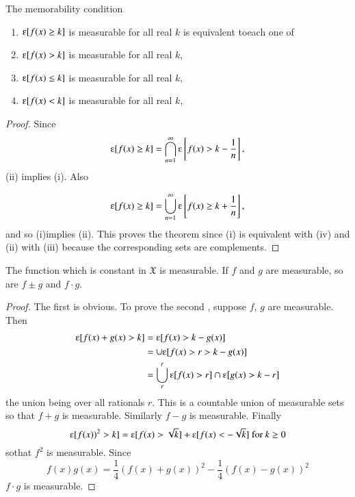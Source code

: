 \begin{theorem}\label{chap1:sec10:thm13}  %
The memorability condition
\end{theorem}

\begin{enumerate}
\renewcommand{\theenumi}{\roman{enumi}}
\renewcommand{\labelenumi}{(\theenumi)}
\item  $\varepsilonup[f(x)\geq k]$ is measurable for all real $k$ is equivalent
to\pageoriginale each one of 
 \item $\varepsilonup[f(x)> k]$ is measurable for all real $k$,
  \item $\varepsilonup[f(x)\leq k]$ is measurable for all real $k$,     
  \item $\varepsilonup[f(x)< k]$ is measurable for all real $k$,
 \end{enumerate}

 \begin{proof}
 Since
 $$
\varepsilonup[f(x)\geq k] =\bigcap^{\infty}_{n=1}
\varepsilonup\left[f(x)>k-\frac{1}{n}\right],
$$
(ii) implies (i). Also 

$$
\varepsilonup[f(x)\geq k] =\bigcup^{\infty}_{n=1} 
\varepsilonup \left[f(x)\geq k+\frac{1}{n}\right],
$$
and so (i)implies (ii). This proves the theorem since (i) is equivalent
  with (iv) and (ii) with (iii) because the corresponding sets are complements.
 \end{proof}

\begin{theorem}\label{chap1:sec10:thm14} 
  The function which is constant in $\mathfrak{X}$ is  measurable. If
  $f$ and $g$ are measurable, so are $f \pm g$ and $f \cdot g$.
\end{theorem}
  
\begin{proof}
     The first is obvious. To prove the second , suppose $f$, $g$ are
     measurable. Then 
     \begin{align*}
       \varepsilonup[f(x) +g(x)> k] &= \varepsilonup[f(x) > k-g(x)]\\
       &=\cup  \varepsilonup[f(x) >r> k-g(x)]\\
       &= \bigcup^{r}_{r} \varepsilonup[f(x) >r] \cap
       \varepsilonup[ g(x)>k-r]
     \end{align*}  
     the union being over all rationals $r$. This is a countable union of
     measurable sets so that $f+g$ is measurable. Similarly $f-g$ is
     measurable. Finally 
     $$
     \varepsilonup[f(x))^2>k]=\varepsilonup[f(x)>\sqrt{k}]+
     \varepsilonup[f(x) < -\sqrt{k}]~\text{for}~k\geq0 
     $$
     so\pageoriginale that $f^2$ is measurable. Since
     $$
     f(x)g(x)= \frac{1}{4}(f(x) +g(x))^2 -\frac{1}{4} (f(x)-g(x))^2
     $$
     $f\cdot g$ is measurable.
\end{proof}

